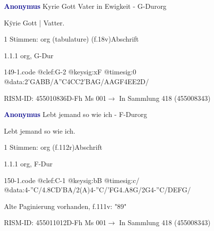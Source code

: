 \documentclass[twocolumn, 12pt]{book}
\begin{document}
\par \vspace{16pt} \textcolor{darkblue}{\textbf{Anonymus  }}\hfillplus{\textbf{[149]}}\newline Kyrie Gott Vater in Ewigkeit - G-Dur\newline org
\par \begin{itshape}[f.18v, at left:] Kÿrie Gott | Vatter.\end{itshape} 
\par \textcolor{darkblue}{}  1 Stimmen: org (tabulature)  (f.18v)\newline Abschrift
\par 1.1.1  org, G-Dur  
\begin{filecontents*}{149-1.code}
@clef:G-2
@keysig:xF
@timesig:0
@data:2'GABB/A''C4CC2'BAG/AAGF4EE2D/
\end{filecontents*}
\newline %
\par RISM-ID: 455010836\newline D-Fh  Ms 001\newline $\rightarrow$ In Sammlung 418 (455008343)
      
\par \vspace{16pt} \textcolor{darkblue}{\textbf{Anonymus  }}\hfillplus{\textbf{[150]}}\newline Lebt jemand so wie ich - F-Dur\newline org
\par \begin{itshape} Lebt jemand so wie ich.\end{itshape} 
\par \textcolor{darkblue}{}  1 Stimmen: org  (f.112r)\newline Abschrift
\par 1.1.1  org, F-Dur  
\begin{filecontents*}{150-1.code}
@clef:C-1
@keysig:bB
@timesig:c/
@data:4-''C/4.8CD'BA/2(A)4-''C/'FG4.A8G/2G4-''C/DEFG/
\end{filecontents*}
\newline %
\par Alte Paginierung vorhanden, f.111v: "89"
\par RISM-ID: 455011012\newline D-Fh  Ms 001\newline $\rightarrow$ In Sammlung 418 (455008343)
      
\end{document}
